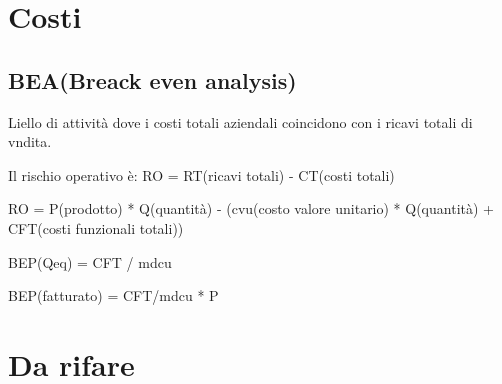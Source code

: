 \section{Costi}
\subsection{BEA(Breack even analysis)}

Liello di attività dove i costi totali aziendali coincidono con i ricavi totali di vndita.

Il rischio operativo è:
RO = RT(ricavi totali) - CT(costi totali)

RO = P(prodotto) * Q(quantità) - (cvu(costo valore unitario) * Q(quantità) + CFT(costi funzionali totali))

BEP(Qeq) = CFT / mdcu

BEP(fatturato) = CFT/mdcu * P

\section{Da rifare}